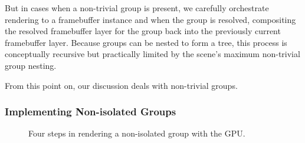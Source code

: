 But in cases when a non-trivial group is present, we carefully orchestrate rendering to a framebuffer
instance and when the group is resolved, compositing the resolved framebuffer layer for the group back into
the previously current framebuffer layer.  Because groups can be nested to form a tree, this process is
conceptually recursive but practically limited by the scene's maximum non-trivial group nesting.

From this point on, our discussion deals with non-trivial groups.

\subsubsection{Implementing Non-isolated Groups}
\label{sec:non-isolated-groups}

\begin{figure}[tb]
  \caption{\label{fig:non-isolated-group} Four steps in rendering a non-isolated group with the GPU.}
\end{figure}

